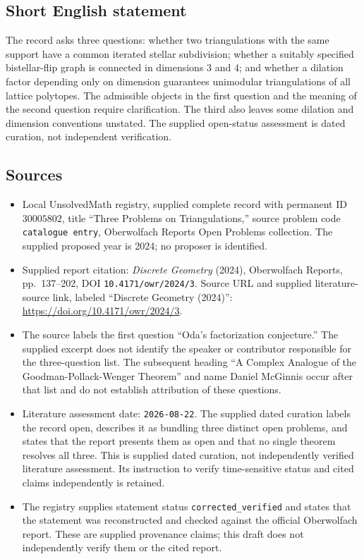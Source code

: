 \documentclass[11pt]{article}
\begin{document}
\subsection{Short English statement}
The record asks three questions: whether two triangulations with the same support have a common iterated stellar subdivision; whether a suitably specified bistellar-flip graph is connected in dimensions \(3\) and \(4\); and whether a dilation factor depending only on dimension guarantees unimodular triangulations of all lattice polytopes. The admissible objects in the first question and the meaning of the second question require clarification. The third also leaves some dilation and dimension conventions unstated. The supplied open-status assessment is dated curation, not independent verification.
\subsection{Sources}
\begin{itemize}
\item Local UnsolvedMath registry, supplied complete record with permanent ID \(30005802\), title ``Three Problems on Triangulations,'' source problem code \texttt{catalogue entry}, Oberwolfach Reports Open Problems collection. The supplied proposed year is 2024; no proposer is identified.
\item Supplied report citation: \emph{Discrete Geometry} (2024), Oberwolfach Reports, pp.~137--202, DOI \texttt{10.4171/owr/2024/3}. Source URL and supplied literature-source link, labeled ``Discrete Geometry (2024)'': \url{https://doi.org/10.4171/owr/2024/3}.
\item The source labels the first question ``Oda's factorization conjecture.'' The supplied excerpt does not identify the speaker or contributor responsible for the three-question list. The subsequent heading ``A Complex Analogue of the Goodman-Pollack-Wenger Theorem'' and name Daniel McGinnis occur after that list and do not establish attribution of these questions.
\item Literature assessment date: \texttt{2026-08-22}. The supplied dated curation labels the record open, describes it as bundling three distinct open problems, and states that the report presents them as open and that no single theorem resolves all three. This is supplied dated curation, not independently verified literature assessment. Its instruction to verify time-sensitive status and cited claims independently is retained.
\item The registry supplies statement status \texttt{corrected\_verified} and states that the statement was reconstructed and checked against the official Oberwolfach report. These are supplied provenance claims; this draft does not independently verify them or the cited report.
\end{itemize}
\end{document}
